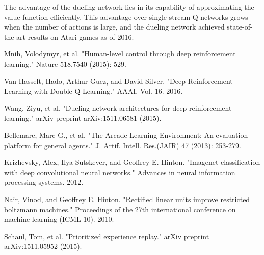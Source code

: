 \documentclass{article}
\begin{document}
The advantage of the dueling network lies in its capability of approximating the value function efficiently. This advantage over single-stream Q networks grows when the number of actions is large, and the dueling network achieved state-of-the-art results on Atari games as of 2016.












\begin{thebibliography}{9}

Mnih, Volodymyr, et al. "Human-level control through deep reinforcement learning." Nature 518.7540 (2015): 529.

Van Hasselt, Hado, Arthur Guez, and David Silver. "Deep Reinforcement Learning with Double Q-Learning." AAAI. Vol. 16. 2016.

Wang, Ziyu, et al. "Dueling network architectures for deep reinforcement learning." arXiv preprint arXiv:1511.06581 (2015).

Bellemare, Marc G., et al. "The Arcade Learning Environment: An evaluation platform for general agents." J. Artif. Intell. Res.(JAIR) 47 (2013): 253-279.

Krizhevsky, Alex, Ilya Sutskever, and Geoffrey E. Hinton. "Imagenet classification with deep convolutional neural networks." Advances in neural information processing systems. 2012.

Nair, Vinod, and Geoffrey E. Hinton. "Rectified linear units improve restricted boltzmann machines." Proceedings of the 27th international conference on machine learning (ICML-10). 2010.

Schaul, Tom, et al. "Prioritized experience replay." arXiv preprint arXiv:1511.05952 (2015).





\end{thebibliography}
\end{document}
